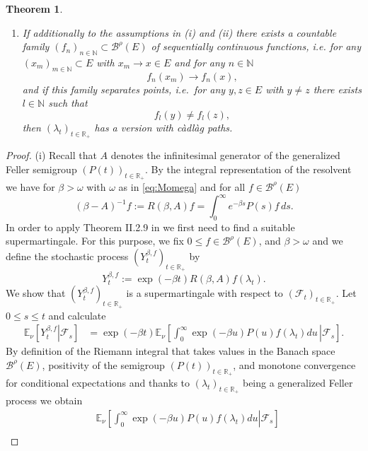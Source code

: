 \documentclass[a4paper,12pt]{article}
\newtheorem{theorem}{Theorem}[section]
\theoremstyle{definition}
\theoremstyle{remark}
\numberwithin{equation}{section}
\numberwithin{theorem}{section}
\begin{document}
\begin{theorem}
\begin{enumerate}
\item[
(iii)] If additionally to the assumptions in (i) and (ii) there exists
a countable family $\left(f_{n}\right)_{n\in\mathbb{N}}\subset\mathcal{\mathscr{B}}^{\rho}(E)$
of sequentially continuous functions, i.e. for any $\left(x_{m}\right)_{m\in\mathbb{N}}\subset E$
with $x_{m}\rightarrow x\in E$ and for any $n\in\mathbb{N}$
\[
f_{n}(x_{m})\rightarrow f_{n}(x),
\]
and if this family separates points, i.e.~for any $y,z\in E$ with $y\neq z$
there exists $l\in\mathbb{N}$ such that
\[
f_{l}(y)\neq f_{l}(z),
\]
 then $\left(\lambda_{t}\right)_{t\in\mathbb{R}_{+}}$ has a version
with càdlàg paths.
\end{enumerate}
\end{theorem}



\begin{proof}
(i)
Recall that $A$ denotes the infinitesimal generator of the generalized Feller semigroup $(P(t))_{t \in \mathbb{R}_+}$.
By the integral representation of the resolvent we have for 
 $\beta>\omega$ with $\omega$ as in \eqref{eq:Momega} and  for all $f\in\mathcal{\mathscr{B}}^{\rho}(E)$
\[
\left(\beta-A\right)^{-1}f:=R(\beta,A)f=\int_{0}^{\infty}e^{-\beta s}P(s)f\,ds.
\]
In order to apply Theorem II.2.9 in \cite{ReY} we first need to find a suitable supermartingale.
 For this purpose, we fix $0\leq f\in\mathcal{\mathscr{B}}^{\rho}(E)$,
and $\beta>\omega$ and we define the stochastic process $\left(Y_{t}^{\beta,f}\right)_{t\in\mathbb{R}_{+}}$
by
\[
Y_{t}^{\beta,f}:=\exp\left(-\beta t\right)R(\beta,A)f(\lambda_{t}).
\]
We show that $\left(Y_{t}^{\beta,f}\right)_{t\in\mathbb{R}_{+}}$
is a supermartingale with respect to $\left(\mathcal{F}_{t}\right)_{t\in\mathbb{R}_{+}}$.
Let $0\leq s\leq t$ and calculate
\begin{align*}
\mathbb{E}_{\nu}\left[\left.Y_{t}^{\beta,f}\right|\mathcal{F}_{s}\right] & =\exp\left(-\beta t\right)\mathbb{E}_{\nu}\left[\left.\int_{0}^{\infty}\exp\left(-\beta u\right)P(u)f(\lambda_{t})du \, \right|\mathcal{F}_{s}\right].
\end{align*}
By definition of the Riemann integral that takes values in the Banach space $\mathcal{\mathscr{B}}^{\rho}(E)$,
positivity of the semigroup $\left(P(t)\right)_{t\in\mathbb{R}_{+}}$,
and monotone convergence for conditional expectations and thanks to $\left(\lambda_{t}\right)_{t\in\mathbb{R}_{+}}$ being
a generalized Feller process we obtain
\begin{align*}
 & \mathbb{E}_{\nu}\left[\left.\int_{0}^{\infty}\exp\left(-\beta u\right)P(u)f(\lambda_{t})du\right|\mathcal{F}_{s}\right]\\

\end{align*}
\end{proof}
\end{document}
